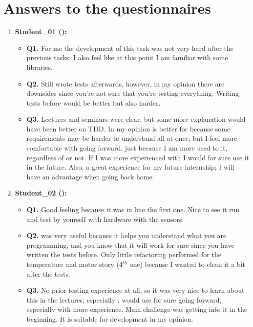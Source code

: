 \section{Answers to the questionnaires}
\begin{enumerate}
    \item \textbf{Student\_01 (\tdd):}
    \begin{itemize}
        \item \textbf{Q1.} For me the development of this task was not very hard after the previous tasks; I also feel like at this point I am familiar with some libraries.
        \item \textbf{Q2.} Still wrote tests afterwards, however, in my opinion there are downsides since you're not sure that you're testing everything. Writing tests before would be better but also harder.
        \item \textbf{Q3.} Lectures and seminars were clear, but some more explanation would have been better on TDD. In my opinion \tdd is better for \ess because some requirements may be harder to understand all at once, but I feel more comfortable with \notdd going forward, just because I am more used to it, regardless of \es or not. If I was more experienced with \tdd I would for sure use it in the future. Also, a great experience for my future internship; I will have an advantage when going back home.
    \end{itemize}

    \item \textbf{Student\_02 (\tdd):}
    \begin{itemize}
        \item \textbf{Q1.} Good feeling because it was in line the first one. Nice to see it run and test by yourself with hardware with the sensors.
        \item \textbf{Q2.} \tdd was very useful because it helps you understand what you are programming, and you know that it will work for sure since you have written the tests before. Only little refactoring performed for the temperature and motor story (4$^{th}$ one) because I wanted to clean it a bit after the tests.
        \item \textbf{Q3.} No prior testing experience at all, so it was very nice to learn about this in the lectures, especially \tdd; would use \tdd for sure going forward, especially with more experience. Main challenge was getting into it in the beginning. It is suitable for \ess development in my opinion.
    \end{itemize}


\end{enumerate}

